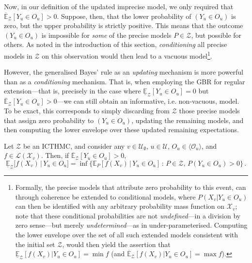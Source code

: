 \documentclass[twoside,11pt]{article}
\newcommand{\states}{\mathcal{X}}
\newcommand{\gambles}{\mathcal{L}}
\begin{document}
Now, in our definition of the updated imprecise model, we only required that $\overline{\mathbb{E}}_\mathcal{Z}[Y_u\in O_u] > 0$. Suppose, then, that the lower probability of $(Y_u\in O_u)$ is zero, but the upper probability is strictly positive. This means that the outcome $(Y_u\in O_u)$ is impossible for \emph{some} of the precise models $P\in\mathcal{Z}$, but possible for others. As noted in the introduction of this section, \emph{conditioning} all precise models in $\mathcal{Z}$ on this observation would then lead to a vacuous model\footnote{Formally, the precise models that attribute zero probability to this event, can through coherence be extended to conditional models, where $P(X_v\vert Y_u\in O_u)$ can then be identified with any arbitrary probability mass function on $\states_v$; note that these conditional probabilities are not \emph{undefined}---in a division by zero sense---but merely \emph{undetermined}---as in under-parameterised. Computing the lower envelope over the set of all such extended models consistent with the initial set $\mathcal{Z}$, would then yield the assertion that $\underline{\mathbb{E}}_\mathcal{Z}[f(X_v)\vert Y_u\in O_u]=\min f$ (and $\overline{\mathbb{E}}_\mathcal{Z}[f(X_v)\vert Y_u\in O_u]=\max f$).}.

However, the generalised Bayes' rule as an \emph{updating} mechanism is more powerful than as a \emph{conditioning} mechanism. That is, when employing the GBR for regular extension---that is, precisely in the case where $\underline{\mathbb{E}}_\mathcal{Z}[Y_u\in O_u]=0$ but $\overline{\mathbb{E}}_\mathcal{Z}[Y_u\in O_u] > 0$---we can still obtain an informative, i.e. non-vacuous, model. To be exact, this corresponds to simply discarding from $\mathcal{Z}$ those precise models that assign zero probability to $(Y_u\in O_u)$, updating the remaining models, and then computing the lower envelope over these updated remaining expectations.

\begin{proposition}\label{prop:GBR_regular}
Let $\mathcal{Z}$ be an ICTHMC, and consider any $v\in\mathcal{U}_\emptyset$, $u\in\mathcal{U}$, $O_u\in\langle\mathcal{O}_u\rangle$, and $f\in\gambles(\states_v)$. Then, if $\overline{\mathbb{E}}_\mathcal{Z}[Y_u\in O_u] > 0$,
\begin{equation*}
\underline{\mathbb{E}}_{\mathcal{Z}}\bigl[f(X_v)\,\vert\,Y_u\in O_u\bigr] = \inf\bigl\{ \mathbb{E}_P[f(X_v)\,\vert\,Y_u\in O_u]\,:\, P\in\mathcal{Z},\, P(Y_u\in O_u)>0 \bigr\}\,.
\end{equation*}
\end{proposition}
\end{document}
